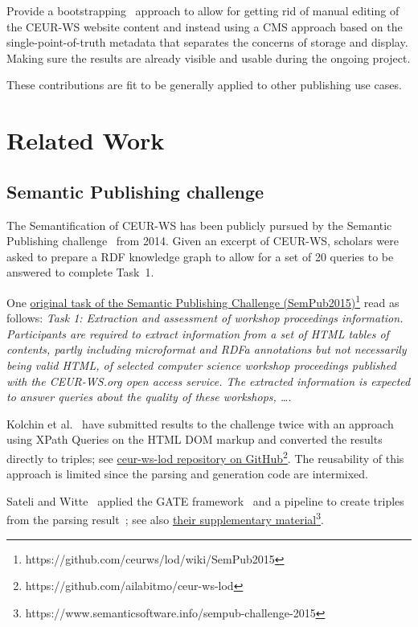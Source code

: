 \documentclass[]{ceurart}
\newcommand{\footnotelink}[2]{\href{#1}{#2}\footnote{#1}}
\begin{document}
Provide a bootstrapping~\cite{Bardini2001,Engelbart2007} approach to allow for getting rid of manual editing of the CEUR-WS website content and instead using a CMS approach based on the single-point-of-truth metadata that separates the concerns of storage and display. Making sure the results are already visible and usable during the ongoing project.

These contributions are fit to be generally applied to other publishing use cases.

\section{Related Work}\label{sec:Related Work}
\subsection{Semantic Publishing challenge}\label{sec:sempub_challenge}
The Semantification of CEUR-WS has been publicly pursued by the Semantic Publishing challenge~\cite{Lange2014} from 2014. Given an excerpt of CEUR-WS, scholars were asked to prepare a RDF knowledge graph to allow for a set of 20 queries to be answered to complete Task~1.

One \footnotelink{https://github.com/ceurws/lod/wiki/SemPub2015}{original task of the Semantic Publishing Challenge (SemPub2015)} read as follows:
\textit{Task 1: Extraction and assessment of workshop proceedings information.
Participants are required to extract information from a set of HTML tables of contents, partly including microformat and RDFa annotations but not necessarily being valid HTML, of selected computer science workshop proceedings published with the CEUR-WS.org open access service. The extracted information is expected to answer queries about the quality of these workshops, \dots}. 

Kolchin et al.~\cite{Kolchin2014,Kolchin2015} have submitted results to the challenge twice with an approach using XPath Queries on the HTML DOM markup and converted the results directly to triples; see \footnotelink{https://github.com/ailabitmo/ceur-ws-lod}{ceur-ws-lod repository on GitHub}. 
The reusability of this approach is limited since the parsing and generation code are intermixed.

Sateli and Witte~\cite{Sateli2015} applied the GATE framework~\cite{Cunningham_2001, Cunningham_2013} and a pipeline to create triples from the parsing result~\cite{Sateli2016}; see also \footnotelink{https://www.semanticsoftware.info/sempub-challenge-2015}{their supplementary material}. 
\end{document}
